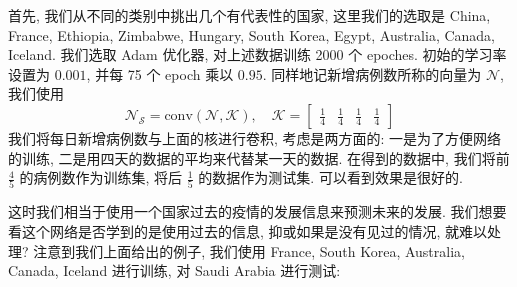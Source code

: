 \documentclass[UTF8]{ctexart}
\begin{document}
    首先, 我们从不同的类别中挑出几个有代表性的国家, 这里我们的选取是 China, France, Ethiopia, Zimbabwe, Hungary, South Korea, Egypt, Australia, Canada, Iceland. 我们选取 Adam 优化器, 对上述数据训练 2000 个 epoches. 初始的学习率设置为 $0.001$, 并每 75 个 epoch 乘以 $0.95$. 同样地记新增病例数所称的向量为 $\mathcal{N}$, 我们使用
	\[
		\mathcal{N}_{\mathcal{S}} = \text{conv}(\mathcal{N},\mathcal{K}), \quad \mathcal{K} = \begin{bmatrix}
			\displaystyle\frac{1}{4}&\displaystyle\frac{1}{4}&\displaystyle\frac{1}{4}&\displaystyle\frac{1}{4}
	\end{bmatrix}
	\]
	我们将每日新增病例数与上面的核进行卷积, 考虑是两方面的: 一是为了方便网络的训练, 二是用四天的数据的平均来代替某一天的数据.
	在得到的数据中, 我们将前 $\frac{4}{5}$ 的病例数作为训练集, 将后 $\frac{1}{5}$ 的数据作为测试集. 可以看到效果是很好的.
	\begin{figure}[htbp]
	    \centering
	\end{figure}
	这时我们相当于使用一个国家过去的疫情的发展信息来预测未来的发展. 我们想要看这个网络是否学到的是使用过去的信息, 抑或如果是没有见过的情况, 就难以处理? 注意到我们上面给出的例子, 我们使用 France, South Korea, Australia, Canada, Iceland 进行训练, 对 Saudi Arabia 进行测试:
\end{document}
